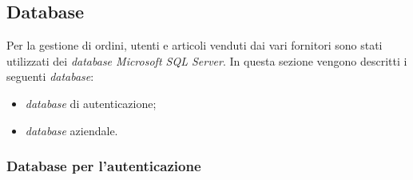 \documentclass[12pt, a4paper, titlepage]{report}
\begin{document}
	\subsection{Database}
	
	Per la gestione di ordini, utenti e articoli venduti dai vari fornitori sono stati utilizzati dei \textit{database Microsoft SQL Server}. In questa sezione vengono descritti i seguenti \textit{database}:
	\begin{itemize}
		\item \textit{database} di autenticazione;
		\item \textit{database} aziendale.
	\end{itemize}
	
	\subsubsection{Database per l'autenticazione}
	
\end{document}
